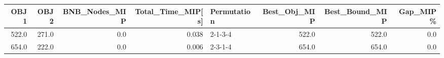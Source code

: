 \begin{tabular}{rrrrlrrr}
\toprule
  OBJ1 &   OBJ2 &  BNB\_Nodes\_MIP &  Total\_Time\_MIP[s] & Permutation &  Best\_Obj\_MIP &  Best\_Bound\_MIP &  Gap\_MIP\% \\
\midrule
 522.0 &  271.0 &            0.0 &              0.038 &     2-1-3-4 &         522.0 &           522.0 &       0.0 \\
 654.0 &  222.0 &            0.0 &              0.006 &     2-3-1-4 &         654.0 &           654.0 &       0.0 \\
\bottomrule
\end{tabular}
